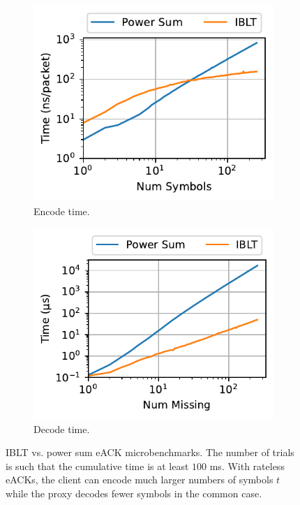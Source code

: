 \begin{figure}[t]
    \centering
    \begin{subfigure}[b]{0.49\linewidth}
        \centering
        \includegraphics[width=\linewidth]{packrat-paper/figures/quack_encode.pdf}
        \caption{Encode time.}
        \label{fig:quack:encode}
    \end{subfigure}
    \begin{subfigure}[b]{0.49\linewidth}
        \centering
        \includegraphics[width=\linewidth]{packrat-paper/figures/quack_decode.pdf}
        \caption{Decode time.}
        \label{fig:quack:decode}
    \end{subfigure}
    \caption{IBLT vs. power sum eACK microbenchmarks. The number of trials is
     such that the cumulative time is at least $100$ ms. With rateless eACKs,
     the client can encode much larger numbers of symbols $t$ while the proxy
     decodes fewer symbols in the common case.
     }
    \label{fig:quack}
\end{figure}